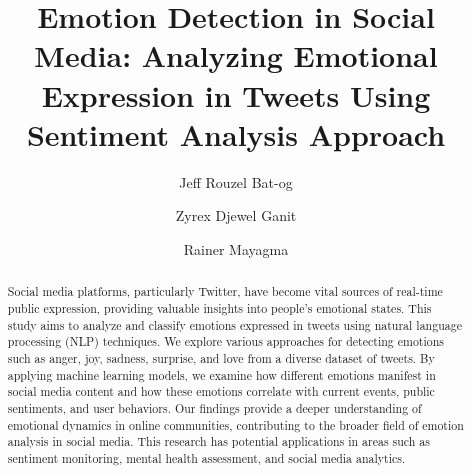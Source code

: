 
\title{Emotion Detection in Social Media: Analyzing Emotional Expression in Tweets Using Sentiment Analysis Approach}
\author{Jeff Rouzel Bat-og \and Zyrex Djewel Ganit \and Rainer Mayagma}

\maketitle


\begin{abstract}
	Social media platforms, particularly Twitter, have become vital sources of real-time public expression, providing valuable insights into people's emotional states. This study aims to analyze and classify emotions expressed in tweets using natural language processing (NLP) techniques. We explore various approaches for detecting emotions such as anger, joy, sadness, surprise, and love from a diverse dataset of tweets. By applying machine learning models, we examine how different emotions manifest in social media content and how these emotions correlate with current events, public sentiments, and user behaviors. Our findings provide a deeper understanding of emotional dynamics in online communities, contributing to the broader field of emotion analysis in social media. This research has potential applications in areas such as sentiment monitoring, mental health assessment, and social media analytics.
\end{abstract}


